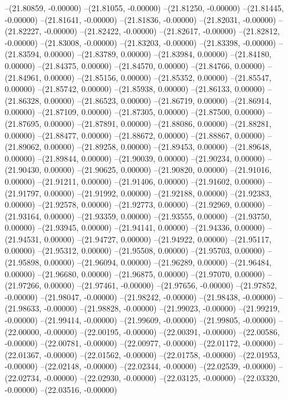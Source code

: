 --(21.80859, -0.00000)
--(21.81055, -0.00000)
--(21.81250, -0.00000)
--(21.81445, -0.00000)
--(21.81641, -0.00000)
--(21.81836, -0.00000)
--(21.82031, -0.00000)
--(21.82227, -0.00000)
--(21.82422, -0.00000)
--(21.82617, -0.00000)
--(21.82812, -0.00000)
--(21.83008, -0.00000)
--(21.83203, -0.00000)
--(21.83398, -0.00000)
--(21.83594, 0.00000)
--(21.83789, 0.00000)
--(21.83984, 0.00000)
--(21.84180, 0.00000)
--(21.84375, 0.00000)
--(21.84570, 0.00000)
--(21.84766, 0.00000)
--(21.84961, 0.00000)
--(21.85156, 0.00000)
--(21.85352, 0.00000)
--(21.85547, 0.00000)
--(21.85742, 0.00000)
--(21.85938, 0.00000)
--(21.86133, 0.00000)
--(21.86328, 0.00000)
--(21.86523, 0.00000)
--(21.86719, 0.00000)
--(21.86914, 0.00000)
--(21.87109, 0.00000)
--(21.87305, 0.00000)
--(21.87500, 0.00000)
--(21.87695, 0.00000)
--(21.87891, 0.00000)
--(21.88086, 0.00000)
--(21.88281, 0.00000)
--(21.88477, 0.00000)
--(21.88672, 0.00000)
--(21.88867, 0.00000)
--(21.89062, 0.00000)
--(21.89258, 0.00000)
--(21.89453, 0.00000)
--(21.89648, 0.00000)
--(21.89844, 0.00000)
--(21.90039, 0.00000)
--(21.90234, 0.00000)
--(21.90430, 0.00000)
--(21.90625, 0.00000)
--(21.90820, 0.00000)
--(21.91016, 0.00000)
--(21.91211, 0.00000)
--(21.91406, 0.00000)
--(21.91602, 0.00000)
--(21.91797, 0.00000)
--(21.91992, 0.00000)
--(21.92188, 0.00000)
--(21.92383, 0.00000)
--(21.92578, 0.00000)
--(21.92773, 0.00000)
--(21.92969, 0.00000)
--(21.93164, 0.00000)
--(21.93359, 0.00000)
--(21.93555, 0.00000)
--(21.93750, 0.00000)
--(21.93945, 0.00000)
--(21.94141, 0.00000)
--(21.94336, 0.00000)
--(21.94531, 0.00000)
--(21.94727, 0.00000)
--(21.94922, 0.00000)
--(21.95117, 0.00000)
--(21.95312, 0.00000)
--(21.95508, 0.00000)
--(21.95703, 0.00000)
--(21.95898, 0.00000)
--(21.96094, 0.00000)
--(21.96289, 0.00000)
--(21.96484, 0.00000)
--(21.96680, 0.00000)
--(21.96875, 0.00000)
--(21.97070, 0.00000)
--(21.97266, 0.00000)
--(21.97461, -0.00000)
--(21.97656, -0.00000)
--(21.97852, -0.00000)
--(21.98047, -0.00000)
--(21.98242, -0.00000)
--(21.98438, -0.00000)
--(21.98633, -0.00000)
--(21.98828, -0.00000)
--(21.99023, -0.00000)
--(21.99219, -0.00000)
--(21.99414, -0.00000)
--(21.99609, -0.00000)
--(21.99805, -0.00000)
--(22.00000, -0.00000)
--(22.00195, -0.00000)
--(22.00391, -0.00000)
--(22.00586, -0.00000)
--(22.00781, -0.00000)
--(22.00977, -0.00000)
--(22.01172, -0.00000)
--(22.01367, -0.00000)
--(22.01562, -0.00000)
--(22.01758, -0.00000)
--(22.01953, -0.00000)
--(22.02148, -0.00000)
--(22.02344, -0.00000)
--(22.02539, -0.00000)
--(22.02734, -0.00000)
--(22.02930, -0.00000)
--(22.03125, -0.00000)
--(22.03320, -0.00000)
--(22.03516, -0.00000)
